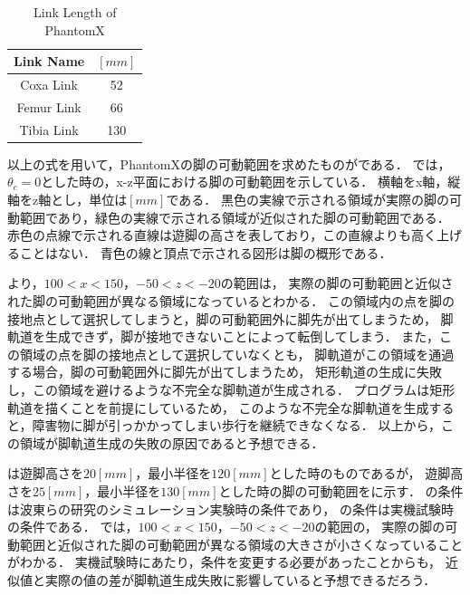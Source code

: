 \begin{table}[h]
	\caption{Link Length of PhantomX}
	\label{tab:link_len_phantom_x}  %
	\begin{center}
   	\begin{tabular}{|c||c|} \hline  %
      Link Name & $[mm]$ \\ \hline  %
      Coxa Link & 52  \\ \hline  %
      Femur Link & 66  \\ \hline  %
      Tibia Link & 130  \\ \hline  %
    \end{tabular}
  \end{center}
\end{table}

\newpage

以上の式を用いて，PhantomXの脚の可動範囲を求めたものがである．
では，$\theta_c = 0$とした時の，x-z平面における脚の可動範囲を示している．
横軸をx軸，縦軸をz軸とし，単位は$[mm]$である．
黒色の実線で示される領域が実際の脚の可動範囲であり，緑色の実線で示される領域が近似された脚の可動範囲である．
赤色の点線で示される直線は遊脚の高さを表しており，この直線よりも高く上げることはない．
青色の線と頂点で示される図形は脚の概形である．

より，$100 < x < 150$，$-50 < z < -20$の範囲は，
実際の脚の可動範囲と近似された脚の可動範囲が異なる領域になっているとわかる．
この領域内の点を脚の接地点として選択してしまうと，脚の可動範囲外に脚先が出てしまうため，
脚軌道を生成できず，脚が接地できないことによって転倒してしまう．
また，この領域の点を脚の接地点として選択していなくとも，
脚軌道がこの領域を通過する場合，脚の可動範囲外に脚先が出てしまうため，
矩形軌道の生成に失敗し，この領域を避けるような不完全な脚軌道が生成される．
プログラムは矩形軌道を描くことを前提にしているため，
このような不完全な脚軌道を生成すると，障害物に脚が引っかかってしまい歩行を継続できなくなる．
以上から，この領域が脚軌道生成の失敗の原因であると予想できる．

は遊脚高さを$20 [mm]$，最小半径を$120 [mm]$とした時のものであるが，
遊脚高さを$25 [mm]$，最小半径を$130 [mm]$とした時の脚の可動範囲をに示す．
の条件は波東らの研究\cite{Hato_Graph_search}のシミュレーション実験時の条件であり，
の条件は実機試験時の条件である．
では，$100 < x < 150$，$-50 < z < -20$の範囲の，
実際の脚の可動範囲と近似された脚の可動範囲が異なる領域の大きさが小さくなっていることがわかる．
実機試験時にあたり，条件を変更する必要があったことからも，
近似値と実際の値の差が脚軌道生成失敗に影響していると予想できるだろう．

